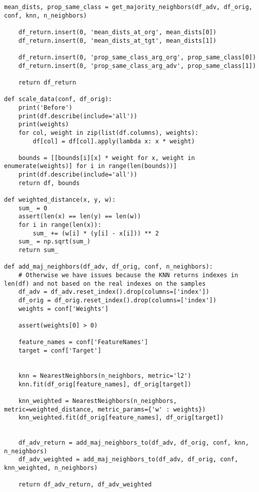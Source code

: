 \begin{lstlisting}[style=python, caption=評価指標の計算を行うMetrics.py]
    mean_dists, prop_same_class = get_majority_neighbors(df_adv, df_orig, conf, knn, n_neighbors)
    
    df_return.insert(0, 'mean_dists_at_org', mean_dists[0])
    df_return.insert(0, 'mean_dists_at_tgt', mean_dists[1])

    df_return.insert(0, 'prop_same_class_arg_org', prop_same_class[0])
    df_return.insert(0, 'prop_same_class_arg_adv', prop_same_class[1])
    
    return df_return

def scale_data(conf, df_orig):
    print('Before')
    print(df.describe(include='all'))
    print(weights)
    for col, weight in zip(list(df.columns), weights):
        df[col] = df[col].apply(lambda x: x * weight)
        
    bounds = [[bounds[i][x] * weight for x, weight in enumerate(weights)] for i in range(len(bounds))]
    print(df.describe(include='all'))
    return df, bounds

def weighted_distance(x, y, w):
    sum_ = 0
    assert(len(x) == len(y) == len(w))
    for i in range(len(x)):
        sum_ += (w[i] * (y[i] - x[i])) ** 2
    sum_ = np.sqrt(sum_)
    return sum_

def add_maj_neighbors(df_adv, df_orig, conf, n_neighbors):
    # Otherwise we have issues because the KNN returns indexes in len(df) and not based on the real indexes on the samples
    df_adv = df_adv.reset_index().drop(columns=['index'])
    df_orig = df_orig.reset_index().drop(columns=['index'])
    weights = conf['Weights']

    assert(weights[0] > 0)

    feature_names = conf['FeatureNames']
    target = conf['Target']
        
        
    knn = NearestNeighbors(n_neighbors, metric='l2')
    knn.fit(df_orig[feature_names], df_orig[target])
    
    knn_weighted = NearestNeighbors(n_neighbors, metric=weighted_distance, metric_params={'w' : weights})
    knn_weighted.fit(df_orig[feature_names], df_orig[target])

    
    df_adv_return = add_maj_neighbors_to(df_adv, df_orig, conf, knn, n_neighbors)
    df_adv_weighted = add_maj_neighbors_to(df_adv, df_orig, conf, knn_weighted, n_neighbors)
    
    return df_adv_return, df_adv_weighted
\end{lstlisting}
